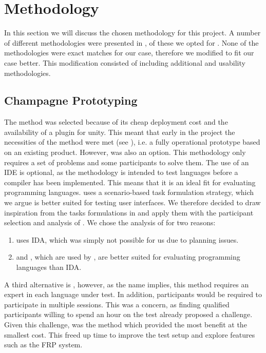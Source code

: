 \section{Methodology}
In this section we will discuss the chosen methodology for this project. A number of different methodologies were presented in , of these we opted for \champagne. None of the methodologies were exact matches for our case, therefore we modified \champagne to fit our case better. This modification consisted of including additional \attentions and \cognitive usability methodologies.

\subsection{Champagne Prototyping}
The \champagne method was selected because of its cheap deployment cost and the availability of a \fs plugin for unity\cite{fsharp2019plugin}. This meant that early in the project the necessities of the method were met (see ), i.e. a fully operational prototype based on an existing product. However, \discount was also an option. This methodology only requires a set of problems and some participants to solve them. The use of an \gls{IDE} is optional, as the methodology is intended to test languages before a compiler has been implemented. This means that it is an ideal fit for evaluating programming languages. \champagne uses a scenario-based task formulation strategy, which we argue is better suited for testing user interfaces. We therefore decided to draw inspiration from the tasks formulations in \discount and apply them with the participant selection and analysis of \champagne. We chose the analysis of \champagne for two reasons:
\begin{enumerate}
    \item \discount uses \gls{IDA}, which was simply not possible for us due to planning issues.
    \item \cognitive and \attention, which are used by \champagne, are better suited for evaluating programming languages than \gls{IDA}.
\end{enumerate}

A third alternative is \expert, however, as the name implies, this method requires an expert in each language under test. In addition, participants would be required to participate in multiple sessions. This was a concern, as finding qualified participants willing to spend an hour on the test already proposed a challenge. Given this challenge, \champagne was the method which provided the most benefit at the smallest cost. This freed up time to improve the test setup and explore features such as the \gls{FRP} system.

